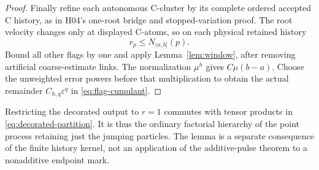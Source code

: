 \documentclass[11pt]{article}
\newcommand{\eps}{\varepsilon}
\theoremstyle{definition}\newtheorem{definition}[theorem]{Definition}
\theoremstyle{remark}\newtheorem{remark}[theorem]{Remark}
\numberwithin{equation}{section}
\begin{document}
\begin{proof}
Finally refine each autonomous C-cluster by its complete ordered accepted
C history, as in H04's one-root bridge and stopped-variation proof. The
root velocity changes only at displayed C-atoms, so on each physical retained
history
\begin{equation}\label{eq:flag-count}
 r_p\le N_{(a,b]}(p).
\end{equation}
Bound all other flags by one and apply Lemma~\ref{lem:window}, after removing
artificial coarse-estimate links. The normalization $\mu^h$ gives
$C\mu(b-a)$. Choose the unweighted error powers before that multiplication
to obtain the actual remainder $C_{h,q}\eps^q$ in
\eqref{eq:flag-cumulant}.
\end{proof}
Restricting the decorated output to $r=1$ commutes with tensor products in
\eqref{eq:decorated-partition}. It is thus the ordinary factorial hierarchy
of the point process retaining just the jumping particles. The lemma is a
separate consequence of the finite history kernel, not an application of
the additive-pulse theorem to a nonadditive endpoint mark.
\end{document}
